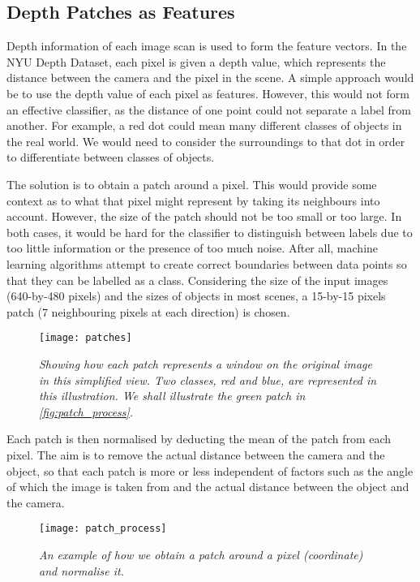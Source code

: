 \subsection{Depth Patches as Features}
Depth information of each image scan is used to form the feature vectors. In the NYU Depth Dataset, each pixel is given a depth value, which represents the distance between the camera and the pixel in the scene. A simple approach would be to use the depth value of each pixel as features. However, this would not form an effective classifier, as the distance of one point could not separate a label from another. For example, a red dot could mean many different classes of objects in the real world. We would need to consider the surroundings to that dot in order to differentiate between classes of objects.

The solution is to obtain a patch around a pixel. This would provide some context as to what that pixel might represent by taking its neighbours into account. However, the size of the patch should not be too small or too large. In both cases, it would be hard for the classifier to distinguish between labels due to too little information or the presence of too much noise. After all, machine learning algorithms attempt to create correct boundaries between data points so that they can be labelled as a class. Considering the size of the input images (640-by-480 pixels) and the sizes of objects in most scenes, a 15-by-15 pixels patch (7 neighbouring pixels at each direction) is chosen.

\begin{figure}[h]
  \centering
  \texttt{[image: patches]}
  \caption{\textit{Showing how each patch represents a window on the original image in this simplified view. Two classes, red and blue, are represented in this illustration. We shall illustrate the green patch in \protect\autoref{fig:patch_process}.}}
  \label{fig:patches}
\end{figure}

Each patch is then normalised by deducting the mean of the patch from each pixel. The aim is to remove the actual distance between the camera and the object, so that each patch is more or less independent of factors such as the angle of which the image is taken from and the actual distance between the object and the camera. 

\begin{figure}[H]
  \centering
  \texttt{[image: patch\_process]}
  \caption{\textit{An example of how we obtain a patch around a pixel (coordinate) and normalise it.}}
  \label{fig:patch_process}
\end{figure}

